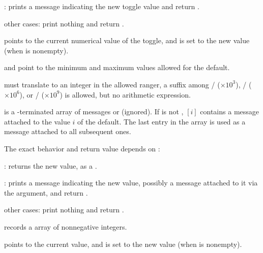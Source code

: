 \item {}: prints a message indicating the new toggle value
and return .

\item other cases: print nothing and return .



\item {} points to the current numerical value of the toggle, and is set
to the new value (when  is nonempty).

\item {} and  point to the minimum and maximum values allowed
for the default.

\item {} must translate to an integer in the allowed ranger, a suffix
among
/ ($\times 10^3$),
/ ($\times 10^6$),
or
/ ($\times 10^9$) is allowed, but no arithmetic expression.

\item {} is a \kbd[NULL]-terminated array of messages or 
(ignored). If  is not , $[i]$ contains
a message attached to the value $i$ of the default. The last entry in the
 array is used as a message attached to all subsequent ones.

The exact behavior and return value depends on :

\item {}: returns the new value, as a .

\item {}: prints a message indicating the new value,
possibly a message attached to it via the  argument, and return
.

\item other cases: print nothing and return .


\item records a  array of nonnegative integers.

\item {} points to the current  value, and is set to the
new value (when  is nonempty).

